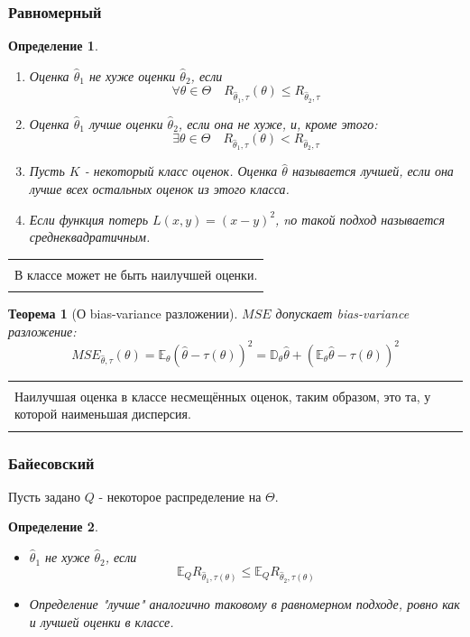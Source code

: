 \documentclass[a4paper,12pt]{article}
\newcommand{\expec}{\mathbb{E}}
\newcommand{\disp}{\mathbb{D}}
\newenvironment{annotation}{\begin{center}
    \begin{tabular}{|p{0.9\textwidth}|}
    \hline\\
}
{ 
    \\\\\hline
    \end{tabular} 
    \end{center}
}
\newtheorem{dfn}{Определение}[section]
\theoremstyle{named}
\newtheorem*{namedtheorem}{Теорема}
\begin{document}
\subsubsection{Равномерный}
\begin{dfn}
    \begin{enumerate}
        \item Оценка $\hat\theta_1 $ не хуже оценки $\hat\theta_2$, если 
        $$
            \forall \theta \in \Theta \quad R_{\hat\theta_1, \tau}(\theta) \leq R_{\hat\theta_2, \tau}
        $$
        \item Оценка $\hat\theta_1 $ лучше оценки $\hat\theta_2$, если она не хуже, и, кроме этого: 
        $$
            \exists \theta \in \Theta \quad R_{\hat\theta_1, \tau}(\theta) < R_{\hat\theta_2, \tau}
        $$
        \item Пусть $K$ - некоторый класс оценок. Оценка $\hat\theta$ называется лучшей, если она лучше всех остальных оценок из этого класса. 
        \item Если функция потерь $L(x, y) = (x - y)^2$, nо такой подход называется среднеквадратичным.
    \end{enumerate}
\end{dfn}
\begin{annotation}
    В классе может не быть наилучшей оценки.
\end{annotation}
\begin{namedtheorem}[О bias-variance разложении]
    $MSE$ допускает bias-variance разложение:
    $$
        MSE_{\hat\theta, \tau}(\theta) = \expec_\theta (\hat\theta - \tau(\theta))^2 = \disp_\theta \hat\theta 
        + \left(\expec_\theta \hat\theta - \tau(\theta)\right)^2
    $$
\end{namedtheorem}
\begin{annotation}
    Наилучшая оценка в классе несмещённых оценок, таким образом, это та, у которой наименьшая дисперсия. 
\end{annotation}
\subsubsection{Байесовский}
Пусть задано $Q$ - некоторое распределение на $\Theta$. 
\begin{dfn}
    \begin{itemize}
        \item $\hat\theta_1$ не хуже $\hat\theta_2$, если 
        $$
            \expec_Q R_{\hat\theta_1, \tau(\theta)} \leq \expec_Q R_{\hat\theta_2, \tau(\theta)}
        $$  
        \item Определение "лучше" аналогично таковому в равномерном подходе, ровно как и лучшей оценки в классе. 
    \end{itemize}
\end{dfn}
\end{document}
